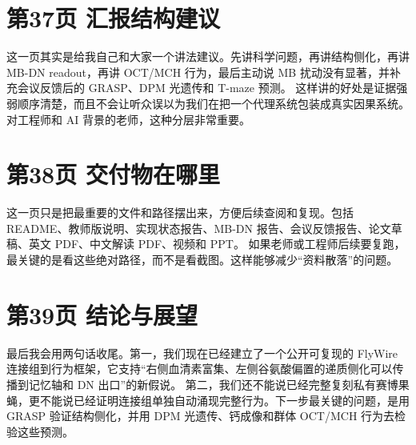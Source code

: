 \documentclass[11pt,fontset=none]{ctexart}
\begin{document}
\section*{第37页 汇报结构建议}
这一页其实是给我自己和大家一个讲法建议。先讲科学问题，再讲结构侧化，再讲 MB-DN readout，再讲 OCT/MCH 行为，最后主动说 MB 扰动没有显著，并补充会议反馈后的 GRASP、DPM 光遗传和 T-maze 预测。
这样讲的好处是证据强弱顺序清楚，而且不会让听众误以为我们在把一个代理系统包装成真实因果系统。对工程师和 AI 背景的老师，这种分层非常重要。
\section*{第38页 交付物在哪里}
这一页只是把最重要的文件和路径摆出来，方便后续查阅和复现。包括 README、教师版说明、实现状态报告、MB-DN 报告、会议反馈报告、论文草稿、英文 PDF、中文解读 PDF、视频和 PPT。
如果老师或工程师后续要复跑，最关键的是看这些绝对路径，而不是看截图。这样能够减少“资料散落”的问题。
\section*{第39页 结论与展望}
最后我会用两句话收尾。第一，我们现在已经建立了一个公开可复现的 FlyWire 连接组到行为框架，它支持“右侧血清素富集、左侧谷氨酸偏置的递质侧化可以传播到记忆轴和 DN 出口”的新假说。
第二，我们还不能说已经完整复刻私有赛博果蝇，更不能说已经证明连接组单独自动涌现完整行为。下一步最关键的问题，是用 GRASP 验证结构侧化，并用 DPM 光遗传、钙成像和群体 OCT/MCH 行为去检验这些预测。
\end{document}
